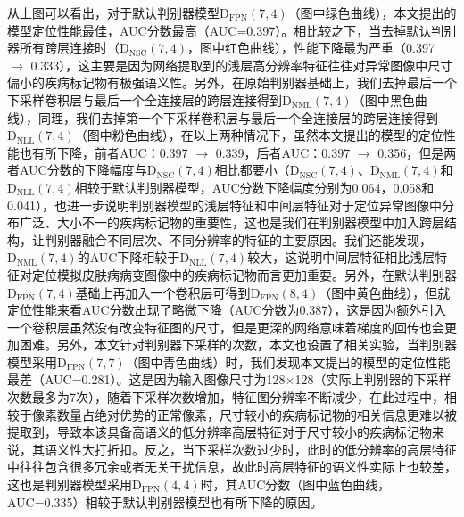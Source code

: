 从上图可以看出，对于默认判别器模型$\mathrm{D}_\mathrm{FPN}(\mathrm{7},\mathrm{4})$（图中绿色曲线），本文提出的模型定位性能最佳，AUC分数最高（AUC=0.397）。相比较之下，当去掉默认判别器所有跨层连接时（$\mathrm{D}_\mathrm{NSC}(7,4)$，图中红色曲线），性能下降最为严重（0.397 $\rightarrow$ 0.333），这主要是因为网络提取到的浅层高分辨率特征往往对异常图像中尺寸偏小的疾病标记物有极强语义性。另外，在原始判别器基础上，我们去掉最后一个下采样卷积层与最后一个全连接层的跨层连接得到$\mathrm{D}_\mathrm{NML}(\mathrm{7},\mathrm{4})$（图中黑色曲线），同理，我们去掉第一个下采样卷积层与最后一个全连接层的跨层连接得到$\mathrm{D}_\mathrm{NLL}(\mathrm{7},\mathrm{4})$（图中粉色曲线），在以上两种情况下，虽然本文提出的模型的定位性能也有所下降，前者AUC：0.397 $\rightarrow$ 0.339，后者AUC：0.397 $\rightarrow$ 0.356，但是两者AUC分数的下降幅度与$\mathrm{D}_\mathrm{NSC}(\mathrm{7},\mathrm{4})$相比都要小（$\mathrm{D}_\mathrm{NSC}(\mathrm{7},\mathrm{4})$、$\mathrm{D}_\mathrm{NML}(\mathrm{7},\mathrm{4})$和$\mathrm{D}_\mathrm{NLL}(\mathrm{7},\mathrm{4})$相较于默认判别器模型，AUC分数下降幅度分别为0.064，0.058和0.041），也进一步说明判别器模型的浅层特征和中间层特征对于定位异常图像中分布广泛、大小不一的疾病标记物的重要性，这也是我们在判别器模型中加入跨层结构，让判别器融合不同层次、不同分辨率的特征的主要原因。我们还能发现，$\mathrm{D}_\mathrm{NML}(\mathrm{7},\mathrm{4})$的AUC下降相较于$\mathrm{D}_\mathrm{NLL}(\mathrm{7},\mathrm{4})$较大，这说明中间层特征相比浅层特征对定位模拟皮肤病病变图像中的疾病标记物而言更加重要。另外，在默认判别器$\mathrm{D}_\mathrm{FPN}(\mathrm{7},\mathrm{4})$基础上再加入一个卷积层可得到$\mathrm{D}_\mathrm{FPN}(\mathrm{8},\mathrm{4})$（图中黄色曲线），但就定位性能来看AUC分数出现了略微下降（AUC分数为0.387），这是因为额外引入一个卷积层虽然没有改变特征图的尺寸，但是更深的网络意味着梯度的回传也会更加困难。另外，本文针对判别器下采样的次数，本文也设置了相关实验，当判别器模型采用$\mathrm{D}_\mathrm{FPN}(\mathrm{7},\mathrm{7})$（图中青色曲线）时，我们发现本文提出的模型的定位性能最差（AUC=0.281）。这是因为输入图像尺寸为128$\times$128（实际上判别器的下采样次数最多为7次），随着下采样次数增加，特征图分辨率不断减少，在此过程中，相较于像素数量占绝对优势的正常像素，尺寸较小的疾病标记物的相关信息更难以被提取到，导致本该具备高语义的低分辨率高层特征对于尺寸较小的疾病标记物来说，其语义性大打折扣。反之，当下采样次数过少时，此时的低分辨率的高层特征中往往包含很多冗余或者无关干扰信息，故此时高层特征的语义性实际上也较差，这也是判别器模型采用$\mathrm{D}_\mathrm{FPN}(\mathrm{4},\mathrm{4})$时，其AUC分数（图中蓝色曲线，AUC=0.335）相较于默认判别器模型也有所下降的原因。

